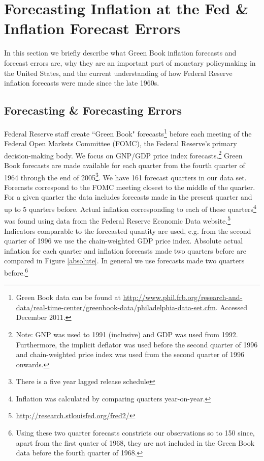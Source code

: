 \documentclass[a4paper]{article}\usepackage{graphicx, color}
\begin{document}

\section{Forecasting Inflation at the Fed \& Inflation Forecast Errors}

In this section we briefly describe what Green Book inflation forecasts and forecast errors are, why they are an important part of monetary policymaking in the United States, and the current understanding of how Federal Reserve inflation forecasts were made since the late 1960s.

\subsection{Forecasting \& Forecasting Errors}

Federal Reserve staff create ``Green Book" forecasts\footnote{Green Book data can be found at {\url{http://www.phil.frb.org/research-and-data/real-time-center/greenbook-data/philadelphia-data-set.cfm}}. Accessed December 2011.} before each meeting of the Federal Open Markets Committee (FOMC), the Federal Reserve's primary decision-making body. We focus on GNP/GDP price index forecasts.\footnote{Note: GNP was used to 1991 (inclusive) and GDP was used from 1992. Furthermore, the implicit deflator was used before the second quarter of 1996 and chain-weighted price index was used from the second quarter of 1996 onwards.} Green Book forecasts are made available for each quarter from the fourth quarter of 1964 through the end of 2005\footnote{There is a five year lagged release schedule}. We have 161 forecast quarters in our data set. Forecasts correspond to the FOMC meeting closest to the middle of the quarter. For a given quarter the data includes forecasts made in the present quarter and up to 5 quarters before. Actual inflation corresponding to each of these quarters\footnote{Inflation was calculated by comparing quarters year-on-year.} was found using data from the Federal Reserve Economic Data website.\footnote{\url{http://research.stlouisfed.org/fred2/}} Indicators comparable to the forecasted quantity are used, e.g. from the second quarter of 1996 we use the chain-weighted GDP price index. Absolute actual inflation for each quarter and inflation forecasts made two quarters before are compared in Figure \ref{absolute}. In general we use forecasts made two quarters before.\footnote{Using these two quarter forecasts constricts our observations so to 150 since, apart from the first quater of 1968, they are not included in the Green Book data before the fourth quarter of 1968.} 
\end{document}
